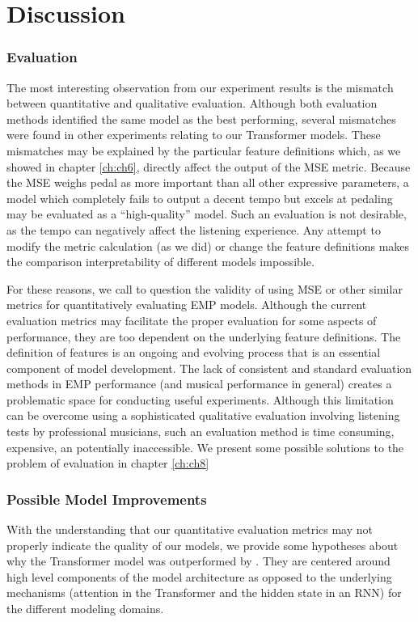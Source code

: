 \chapter{Discussion} \label{ch:ch7}
\subsection{Evaluation}
The most interesting observation from our experiment results is the mismatch between quantitative and qualitative evaluation. Although both evaluation methods identified the same model as the best performing, several mismatches were found in other experiments relating to our Transformer models. These mismatches may be explained by the particular \vnetf{} feature definitions which, as we showed in chapter \ref{ch:ch6}, directly affect the output of the MSE metric. Because the \vnetf{} MSE weighs pedal as more important than all other expressive parameters, a model which completely fails to output a decent tempo but excels at pedaling may be evaluated as a ``high-quality'' model. Such an evaluation is not desirable, as the tempo can negatively affect the listening experience. Any attempt to modify the metric calculation (as we did) or change the feature definitions makes the comparison interpretability of different models impossible. 

For these reasons, we call to question the validity of using MSE or other similar metrics for quantitatively evaluating EMP models. Although the current evaluation metrics may facilitate the proper evaluation for some aspects of performance, they are too dependent on the underlying feature definitions. The definition of features is an ongoing and evolving process that is an essential component of model development. The lack of consistent and standard evaluation methods in EMP performance (and musical performance in general) creates a problematic space for conducting useful experiments. Although this limitation can be overcome using a sophisticated qualitative evaluation involving listening tests by professional musicians, such an evaluation method is time consuming, expensive, an potentially inaccessible. We present some possible solutions to the problem of evaluation in chapter \ref{ch:ch8}

\subsection{Possible Model Improvements}
With the understanding that our quantitative evaluation metrics may not properly indicate the quality of our models, we provide some hypotheses about why the Transformer model was outperformed by \vnet{}. They are centered around high level components of the model architecture as opposed to the underlying mechanisms (attention in the Transformer and the hidden state in an RNN) for the different modeling domains. 

